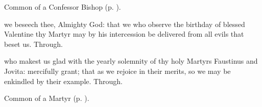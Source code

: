 
\begin{rubric}
	Common of a Confessor Bishop (p. \pageref{ConfessorBishopCollect}).
\end{rubric}




\memorialCollect
{} we beseech thee, Almighty God: that we who observe the birthday of blessed Valentine thy Martyr may by his intercession be delivered from all evils that beset us. Through.




\memorialCollect
{} who makest us glad with the yearly solemnity of thy holy Martyrs Faustinus and Jovita: mercifully grant; that as we rejoice in their merits, so we may be enkindled by their example. Through.



\begin{rubric}
	Common of a Martyr (p. \pageref{CommonMartyrBishopCollect}).
\end{rubric}


\clearpage
{}\label{CathedraAntioch}



